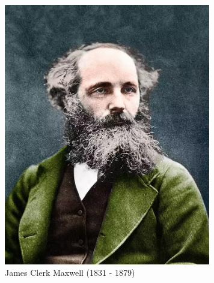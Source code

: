 \begin{figure}[h]
    \centering
       \includegraphics[width=9cm]{archivos/maxwell}
        \caption{James Clerk Maxwell (1831 - 1879) \cite{Maxwell} }
        \label{fig:maxwell}
\end{figure}


